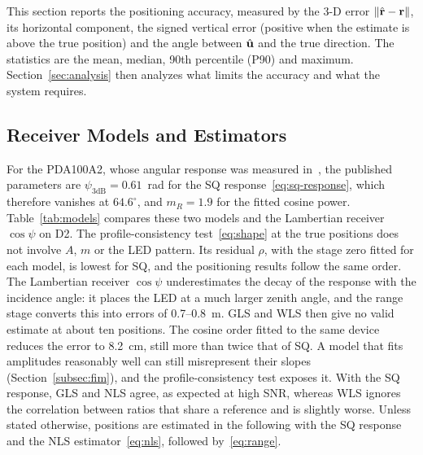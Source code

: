 This section reports the positioning accuracy, measured by the \mbox{3-D} error $\lVert\hat{\mathbf{r}}-\mathbf{r}\rVert$, its horizontal component, the signed vertical error (positive when the estimate is above the true position) and the angle between $\hat{\mathbf{u}}$ and the true direction. The statistics are the mean, median, 90th percentile (P90) and maximum. Section~\ref{sec:analysis} then analyzes what limits the accuracy and what the system requires.


\subsection{Receiver Models and Estimators}
\label{subsec:res-models}
For the PDA100A2, whose angular response was measured in~\cite{Bastiaens2020}, the published parameters are $\psi_{3\mathrm{dB}}=0.61$~rad for the SQ response~\eqref{eq:sq-response}, which therefore vanishes at $64.6^\circ$, and $m_R=1.9$ for the fitted cosine power. Table~\ref{tab:models} compares these two models and the Lambertian receiver $\cos\psi$ on D2. The profile-consistency test~\eqref{eq:shape} at the true positions does not involve $A$, $m$ or the LED pattern. Its residual $\rho$, with the stage zero fitted for each model, is lowest for SQ, and the positioning results follow the same order. The Lambertian receiver $\cos\psi$ underestimates the decay of the response with the incidence angle: it places the LED at a much larger zenith angle, and the range stage converts this into errors of 0.7--0.8~m. GLS and WLS then give no valid estimate at about ten positions. The cosine order fitted to the same device reduces the error to 8.2~cm, still more than twice that of SQ. A model that fits amplitudes reasonably well can still misrepresent their slopes (Section~\ref{subsec:fim}), and the profile-consistency test exposes it.
With the SQ response, GLS and NLS agree, as expected at high SNR, whereas WLS ignores the correlation between ratios that share a reference and is slightly worse. Unless stated otherwise, positions are estimated in the following with the SQ response and the NLS estimator~\eqref{eq:nls}, followed by~\eqref{eq:range}.

